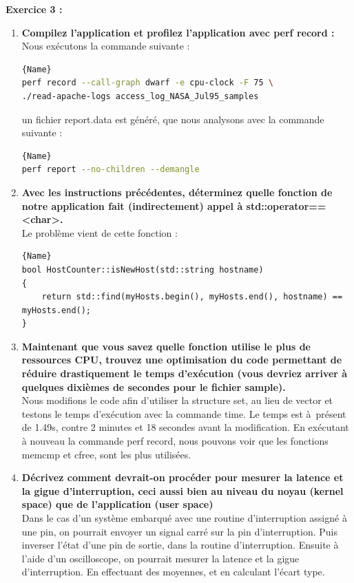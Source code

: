 \documentclass[
	a4paper, %
	10pt, %
]{CSUniSchoolLabReport}
\begin{document}

\textbf{Exercice 3 :}
\begin{enumerate}[label=\textbf{\arabic*}]

\item \textbf{Compilez l’application et profilez l’application avec perf record :}\\
Nous ex\'ecutons la commande suivante :
\begin{lstlisting}[language=bash, firstnumber=1]{Name}
perf record --call-graph dwarf -e cpu-clock -F 75 \
./read-apache-logs access_log_NASA_Jul95_samples
\end{lstlisting}

un fichier report.data est généré, que nous analysons avec la commande suivante :
\begin{lstlisting}[language=bash, firstnumber=1]{Name}
perf report --no-children --demangle
\end{lstlisting}
\item \textbf{Avec les instructions précédentes, déterminez quelle fonction de notre application fait (indirectement) appel à std::operator==<char>.}\\

Le probl\`eme vient de cette fonction :
\begin{lstlisting}[style=CStyle, caption=Extrait de hostcounter.cpp, firstnumber=1]{Name}
bool HostCounter::isNewHost(std::string hostname)
{
    return std::find(myHosts.begin(), myHosts.end(), hostname) == myHosts.end();
}
\end{lstlisting}

\item \textbf{Maintenant que vous savez quelle fonction utilise le plus de ressources CPU, trouvez une optimisation du code permettant de réduire drastiquement le temps d’exécution (vous devriez arriver à quelques dixièmes de secondes pour le fichier sample).}\\
Nous modifions le code afin d'utiliser la structure set, au lieu de vector et testons le temps d'ex\'ecution avec la commande time.
Le temps est \`a\ pr\'esent de 1.49s, contre 2 minutes et 18 secondes avant la modification.
En ex\'ecutant \`a nouveau la commande perf record, nous pouvons voir que les fonctions memcmp et cfree, sont les plus utilisées.

\item \textbf{Décrivez comment devrait-on procéder pour mesurer la latence et la gigue d’interruption, ceci aussi bien au niveau du noyau (kernel space) que de l’application (user space)}\\
Dans le cas d'un syst\`eme embarqué avec une routine d'interruption assigné \`a une pin, on pourrait envoyer un signal carré sur la pin d'interruption.
Puis inverser l'\'etat d'une pin de sortie, dans la routine d'interruption.
Ensuite \`a l'aide d'un oscilloscope, on pourrait mesurer la latence et la gigue d'interruption. En effectuant des moyennes, et en calculant l'\'ecart type.
\end{enumerate}
\end{document}
